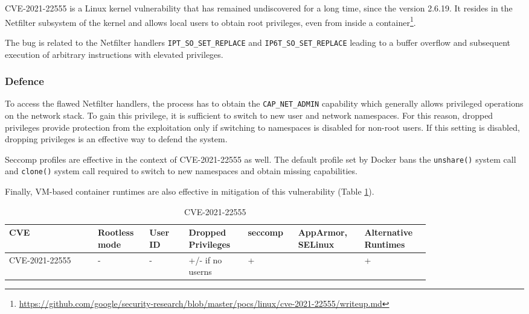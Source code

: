 CVE-2021-22555 is a Linux kernel vulnerability that has remained undiscovered for a long time, since the version 2.6.19. It resides in the Netfilter subsystem of the kernel and allows local users to obtain root privileges, even from inside a container\footnote{\url{https://github.com/google/security-research/blob/master/pocs/linux/cve-2021-22555/writeup.md}}.

The bug is related to the Netfilter handlers \texttt{IPT\_SO\_SET\_REPLACE} and \linebreak \texttt{IP6T\_SO\_SET\_REPLACE} leading to a buffer overflow and subsequent execution of arbitrary instructions with elevated privileges.

\subsubsection*{Defence}

To access the flawed Netfilter handlers, the process has to obtain the \texttt{CAP\_NET\_ADMIN} capability which generally allows privileged operations on the network stack. To gain this privilege, it is sufficient to switch to new user and network namespaces. For this reason, dropped privileges provide protection from the exploitation only if switching to namespaces is disabled for non-root users. If this setting is disabled, dropping privileges is an effective way to defend the system. 

Seccomp profiles are effective in the context of CVE-2021-22555 as well. The default profile set by Docker bans the \texttt{unshare()} system call and \texttt{clone()} system call required to switch to new namespaces and obtain missing capabilities. 

Finally, VM-based container runtimes are also effective in mitigation of this vulnerability (Table \ref{tab:h:6}).

\begin{table}[H]
    \centering \small
    \begin{tabular}{| p{0.18\linewidth} | p{0.1\linewidth} | p{0.08\linewidth} | p{0.12\linewidth} | p{0.09\linewidth} | p{0.12\linewidth} | p{0.12\linewidth} |} \hline
    CVE & Rootless mode & User ID & Dropped Privileges & seccomp & AppArmor, SELinux & Alternative Runtimes \\ \hline
    CVE-2021-22555 & - & - & \cellcolor{yellow!25} +/- \linebreak if no userns & \cellcolor{green!25} + &  & \cellcolor{green!25} + \\ \hline
    \end{tabular}
    \caption{CVE-2021-22555}
    \label{tab:h:6}
\end{table}



